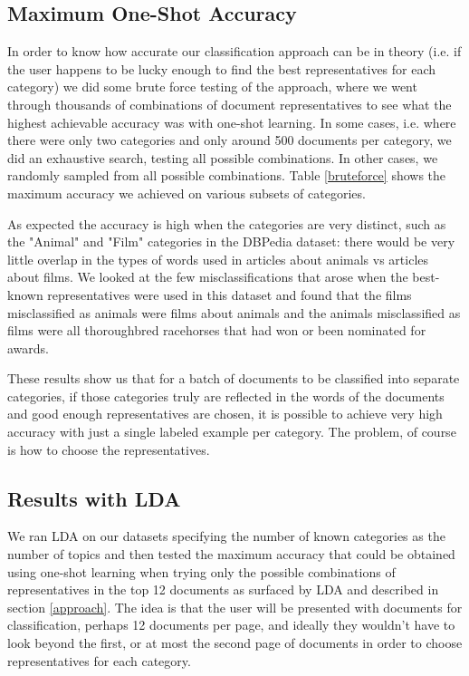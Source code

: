 \subsection{Maximum One-Shot Accuracy}
In order to know how accurate our classification approach can be in theory (i.e. if the user happens to be lucky enough to find the best representatives for each category) we did some brute force testing of the approach, where we went through thousands of combinations of document representatives to see what the highest achievable accuracy was with one-shot learning. In some cases, i.e. where there were only two categories and only around 500 documents per category, we did an exhaustive search, testing all possible combinations. In other cases, we randomly sampled from all possible combinations. Table \ref{bruteforce} shows the maximum accuracy we achieved on various subsets of categories.

As expected the accuracy is high when the categories are very distinct, such as the "Animal" and "Film" categories in the DBPedia dataset: there would be very little overlap in the types of words used in articles about animals vs articles about films. We looked at the few misclassifications that arose when the best-known representatives were used in this dataset and found that the films misclassified as animals were films about animals and the animals misclassified as films were all thoroughbred racehorses that had won or been nominated for awards.

These results show us that for a batch of documents to be classified into separate categories, if those categories truly are reflected in the words of the documents and good enough representatives are chosen, it is possible to achieve very high accuracy with just a single labeled example per category. The problem, of course is how to choose the representatives.

\subsection{Results with LDA}
We ran LDA on our datasets specifying the number of known categories as the number of topics and then tested the maximum accuracy that could be obtained using one-shot learning when trying only the possible combinations of representatives in the top 12 documents as surfaced by LDA and described in section \ref{approach}. The idea is that the user will be presented with documents for classification, perhaps 12 documents per page, and ideally they wouldn't have to look beyond the first, or at most the second page of documents in order to choose representatives for each category.

